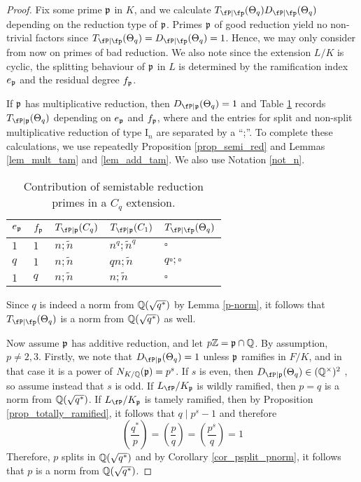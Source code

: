 \begin{proof}
    Fix some prime $\mathfrak{p}$ in $K$, and we calculate $\Tp(\Theta_q)\Dp(\Theta_q)$ depending on the reduction type of $\mathfrak{p}$. Primes $\mathfrak{p}$ of good reduction yield no non-trivial factors since $\Tp(\Theta_q)=\Dp(\Theta_q)=1$. Hence, we may only consider from now on primes of bad reduction. We also note since the extension $L/K$ is cyclic, the splitting behaviour of $\mathfrak{p}$ in $L$ is determined by the ramification index $e_{\mathfrak{p}}$ and the residual degree $f_{\mathfrak{p}}$. 
    
    If $\mathfrak{p}$ has multiplicative reduction, then $D_{\fP\mid\pp}(\Theta_q)=1$ and Table \ref{table_Cp} records $T_{\fP\mid\pp}(\Theta_q)$ depending on $e_{\mathfrak{p}}$ and $f_{\mathfrak{p}}$, where and the entries for split and non-split multiplicative reduction of type $\mathrm{I}_n$ are separated by a ``;''. To complete these calculations, we use repeatedly Proposition \ref{prop_semi_red} and Lemmas \ref{lem_mult_tam} and \ref{lem_add_tam}. We also use Notation \ref{not_n}.

    \begin{table}[!ht]
        \centering
        \begin{tabular}{|l|l|l|l|l|}
        \hline
        $e_{\mathfrak{p}}$ & $f_{\mathfrak{p}}$  & $T_{\fP\mid \pp}(C_q)$ & $T_{\fP\mid \pp}(C_1)$  & $\Tp(\Theta_q)$ \\ \hline
        $1$ & $1$ & $n;\tilde{n}$ & $n^q;\tilde{n}^q$ & $\square$ \\ \hline
        $q$ & $1$ & $n;\tilde{n}$ & $qn;\tilde{n}$ & $q\square;\square$ \\ \hline
        $1$ & $q$ & $n;\tilde{n}$ & $n;\tilde{n}$ & $\square$ \\ \hline
        \end{tabular}
        \caption{Contribution of semistable reduction primes in a $C_q$ extension.}
        \label{table_Cp}
    \end{table}

    Since $q$ is indeed a norm from $\mathbb{Q}(\sqrt{q^*})$ by Lemma \ref{p-norm}, it follows that $\Tp(\Theta_q)$ is a norm from $\mathbb{Q}(\sqrt{q^*})$ as well.

    Now assume $\mathfrak{p}$ has additive reduction, and let $p\mathbb{Z}=\mathfrak{p}\cap\mathbb{Q}$. By assumption, $p\neq2,3$. Firstly, we note that $D_{\fP\mid\pp}(\Theta_q)=1$ unless $\mathfrak{p}$ ramifies in $F/K$, and in that case it is a power of $N_{K/\mathbb{Q}}(\mathfrak{p})=p^s$. If $s$ is even, then $D_{\fP\mid\pp}(\Theta_q)\in\QQss$ , so assume instead that $s$ is odd. If $L_\fP/K_\pp$ is wildly ramified, then $p=q$ is a norm from $\mathbb{Q}(\sqrt{q^*})$. If $L_\fP/K_\pp$ is tamely ramified, then by Proposition \ref{prop_totally_ramified}, it follows that $q\mid p^s-1$ and therefore 
    \begin{equation}
        \left(\frac{q^*}{p}\right)=\left(\frac{p}{q}\right)=\left(\frac{p^s}{q}\right)=1
    \end{equation}
    Therefore, $p$ splits in $\mathbb{Q}(\sqrt{q^*})$ and by Corollary \ref{cor_psplit_pnorm}, it follows that $p$ is a norm from $\mathbb{Q}(\sqrt{q^*})$. 
    

\end{proof}
